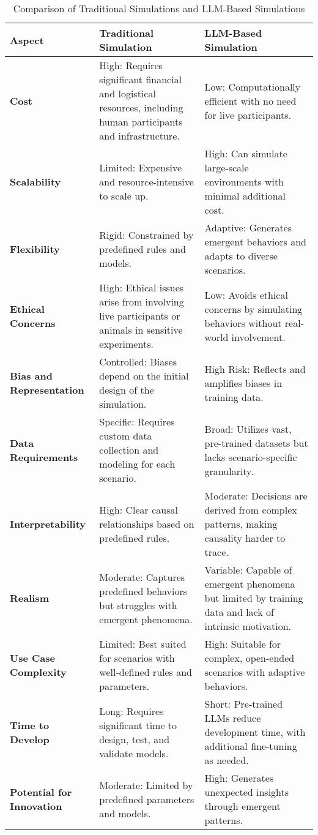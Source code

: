 \begin{table}[h!]
    \centering
    \begin{tabularx}{\textwidth}{|l|X|X|}
        \hline
        \textbf{Aspect} & \textbf{Traditional Simulation} & \textbf{LLM-Based Simulation} \\ \hline
        \textbf{Cost} & High: Requires significant financial and logistical resources, including human participants and infrastructure. & Low: Computationally efficient with no need for live participants. \\ \hline
        \textbf{Scalability} & Limited: Expensive and resource-intensive to scale up. & High: Can simulate large-scale environments with minimal additional cost. \\ \hline
        \textbf{Flexibility} & Rigid: Constrained by predefined rules and models. & Adaptive: Generates emergent behaviors and adapts to diverse scenarios. \\ \hline
        \textbf{Ethical Concerns} & High: Ethical issues arise from involving live participants or animals in sensitive experiments. & Low: Avoids ethical concerns by simulating behaviors without real-world involvement. \\ \hline
        \textbf{Bias and Representation} & Controlled: Biases depend on the initial design of the simulation. & High Risk: Reflects and amplifies biases in training data. \\ \hline
        \textbf{Data Requirements} & Specific: Requires custom data collection and modeling for each scenario. & Broad: Utilizes vast, pre-trained datasets but lacks scenario-specific granularity. \\ \hline
        \textbf{Interpretability} & High: Clear causal relationships based on predefined rules. & Moderate: Decisions are derived from complex patterns, making causality harder to trace. \\ \hline
        \textbf{Realism} & Moderate: Captures predefined behaviors but struggles with emergent phenomena. & Variable: Capable of emergent phenomena but limited by training data and lack of intrinsic motivation. \\ \hline
        \textbf{Use Case Complexity} & Limited: Best suited for scenarios with well-defined rules and parameters. & High: Suitable for complex, open-ended scenarios with adaptive behaviors. \\ \hline
        \textbf{Time to Develop} & Long: Requires significant time to design, test, and validate models. & Short: Pre-trained LLMs reduce development time, with additional fine-tuning as needed. \\ \hline
        \textbf{Potential for Innovation} & Moderate: Limited by predefined parameters and models. & High: Generates unexpected insights through emergent patterns. \\ \hline
    \end{tabularx}
    \caption{Comparison of Traditional Simulations and LLM-Based Simulations}
    \label{tab:simulation_comparison}
\end{table}

